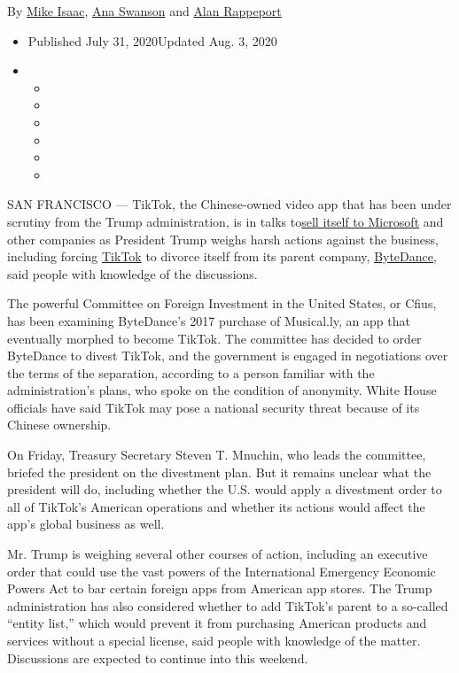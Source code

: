 By \href{https://www.nytimes.com/by/mike-isaac}{Mike Isaac},
\href{https://www.nytimes.com/by/ana-swanson}{Ana Swanson} and
\href{https://www.nytimes.com/by/alan-rappeport}{Alan Rappeport}

\begin{itemize}
\item
  Published July 31, 2020Updated Aug. 3, 2020
\item
  \begin{itemize}
  \item
  \item
  \item
  \item
  \item
  \item
  \end{itemize}
\end{itemize}

SAN FRANCISCO --- TikTok, the Chinese-owned video app that has been
under scrutiny from the Trump administration, is in talks
to\href{https://www.nytimes.com/2020/08/03/technology/tiktok-microsoft-tweens.html}{sell
itself to Microsoft} and other companies as President Trump weighs harsh
actions against the business, including forcing
\href{https://www.nytimes.com/2020/08/03/technology/trump-tiktok-microsoft.html}{TikTok}
to divorce itself from its parent company,
\href{https://www.nytimes.com/2020/08/03/technology/tiktok-trump-sale-microsoft.html}{ByteDance},
said people with knowledge of the discussions.

The powerful Committee on Foreign Investment in the United States, or
Cfius, has been examining ByteDance's 2017 purchase of Musical.ly, an
app that eventually morphed to become TikTok. The committee has decided
to order ByteDance to divest TikTok, and the government is engaged in
negotiations over the terms of the separation, according to a person
familiar with the administration's plans, who spoke on the condition of
anonymity. White House officials have said TikTok may pose a national
security threat because of its Chinese ownership.

On Friday, Treasury Secretary Steven T. Mnuchin, who leads the
committee, briefed the president on the divestment plan. But it remains
unclear what the president will do, including whether the U.S. would
apply a divestment order to all of TikTok's American operations and
whether its actions would affect the app's global business as well.

Mr. Trump is weighing several other courses of action, including an
executive order that could use the vast powers of the International
Emergency Economic Powers Act to bar certain foreign apps from American
app stores. The Trump administration has also considered whether to add
TikTok's parent to a so-called ``entity list,'' which would prevent it
from purchasing American products and services without a special
license, said people with knowledge of the matter. Discussions are
expected to continue into this weekend.

